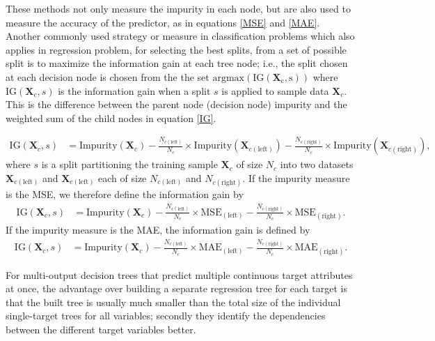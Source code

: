 These methods not only measure the impurity in each node, but are also used to measure the accuracy of the predictor, as in equations \ref{MSE} and \ref{MAE}. Another commonly used strategy or measure in classification problems which also applies in regression problem, for selecting the best splits, from a set of possible split is to maximize the information gain at each tree node; i.e., the split chosen at each decision node is chosen from the the set $\mathrm{argmax (IG(\textbf{X}_{c},s))}$ where $\mathrm{IG}(\textbf{X}_{c},s)$ is the information gain when a split $s$ is applied to sample data $\textbf{X}_c$. This is the difference between the parent node (decision node) impurity and the weighted sum of the child nodes in equation \ref{IG}. 
 
 \begin{align}
 \mathrm{IG}(\textbf{X}_c,s)&= \mathrm{Impurity}(\textbf{X}_c)-\frac{N_{c(\mathrm{left})}}{N_c}\times \mathrm{Impurity}(\textbf{X}_{c(\mathrm{left})})- \frac{N_{c(\mathrm{right})}}{N_c}\times \mathrm{Impurity} (\textbf{X}_{c(\mathrm{right})}), \label{IG}
 \end{align}
 where $s$ is a split partitioning the training sample $\textbf{X}_c$ of size $N_c$ into two datasets $\textbf{X}_{c(\mathrm{left})}$ and $\textbf{X}_{c(\mathrm{left})}$ each of size $N_{c(\mathrm{left})}$ and $N_{c(\mathrm{right})}$.
If the impurity measure is the MSE, we therefore define the information gain by
 \begin{align}
 \mathrm{IG}(\textbf{X}_c,s)&= \mathrm{Impurity}(\textbf{X}_c)-\frac{N_{c(\mathrm{left})}}{N_c}\times \text{MSE}_{(\mathrm{left})}- \frac{N_{c(\mathrm{right})}}{N_c}\times \text{MSE}_{(\mathrm{right})}.
  \end{align}
If the impurity measure is the MAE, the information gain is defined by   
 \begin{align}
 \mathrm{IG}(\textbf{X}_c,s)&= \mathrm{Impurity}(\textbf{X}_c)-\frac{N_{c(\mathrm{left})}}{N_c}\times \text{MAE}_{(\mathrm{left})}- \frac{N_{c(\mathrm{right})}}{N_c}\times \text{MAE}_{(\mathrm{right})}. 
 \end{align}
 
For multi-output decision trees that predict multiple continuous target attributes at once, the advantage over building a separate
regression tree for each target is that the built tree is usually much smaller than the total size of the individual single-target trees for all variables; secondly they identify the dependencies between the different target variables  better.

